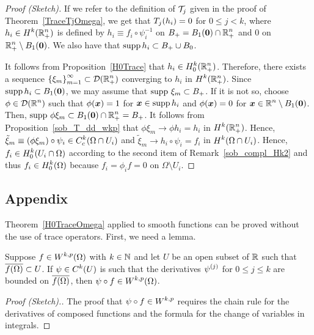 \begin{proof}[Proof (Sketch)]
If we refer to the definition of $\mathcal{T}_j$ given in the proof of
Theorem~\ref{TraceTjOmega}, we get that
$\displaystyle T_j(h_i) = 0$ for $0 \leq j <k$, where
$\displaystyle h_i \in H^k(\mathbb{R}^n_+)$ is defined by
$h_i \equiv f_i \circ \psi_i^{-1}$ on
$\displaystyle B_+ = B_1({\bm{0}}) \cap \mathbb{R}^n_+$
and $0$ on $\displaystyle \mathbb{R}^n_+ \setminus B_1({\bm{0}})$.  We also have that
$\operatorname{supp} h_i \subset B_+ \cup B_0$.

It follows from Proposition~\ref{H0Trace} that
$\displaystyle h_i \in H^k_0(\mathbb{R}^n_+)$.
Therefore, there exists a sequence
$\displaystyle \left\{\xi_m\right\}_{m=1}^\infty \subset \mathcal{D}(\mathbb{R}^n_+)$
converging to $h_i$ in $\displaystyle H^k(\mathbb{R}^n_+)$.  Since
$\operatorname{supp} h_i \subset B_1({\bm{0}})$, we may assume that
$\operatorname{supp}\, \xi_m \subset B_+$.  If it is not
so, choose $\displaystyle \phi \in \mathcal{D}(\mathbb{R}^n)$ such that
$\phi({\bm{x}}) = 1$ for ${\bm{x}} \in \operatorname{supp} h_i$ and $\phi({\bm{x}}) = 0$ for
$\displaystyle {\bm{x}} \in \mathbb{R}^n \setminus B_1({\bm{0}})$.
Then,
$\displaystyle \operatorname{supp}\, \phi \xi_m \subset B_1({\bm{0}}) \cap \mathbb{R}^n_+ = B_+$.
It follows from Proposition~\ref{sob_T_dd_wkp} that
$\phi \xi_m \to \phi h_i = h_i$ in $\displaystyle H^k(\mathbb{R}^n_+)$.
Hence, $\displaystyle \tilde{\xi}_m \equiv (\phi \xi_m) \circ
\psi_i \in C_c^k(\Omega \cap U_i)$
and $\tilde{\xi}_m \to h_i \circ \psi_i = f_i$
in $\displaystyle H^k(\Omega \cap U_i)$.
Hence, $\displaystyle f_i \in H^k_0(U_i \cap \Omega)$
according to the second item of Remark~\ref{sob_compl_Hk2}
and thus $\displaystyle f_i \in H^k_0(\Omega)$ because $f_i = \phi_i f = 0$ on
$\Omega \setminus U_i$.
\end{proof}

\subsection{Appendix}

Theorem~\ref{H0TraceOmega} applied to smooth functions can be proved
without the use of trace operators.  First, we need a lemma.

\begin{lemma} \label{sob_comp_DF}
Suppose $\displaystyle f \in W^{k,p}(\Omega)$ with $k\in \mathbb{N}$ and let
$U$ be an open subset of $\mathbb{R}$ such that
$\displaystyle \overline{ f(\Omega)} \subset U$.  If
$\displaystyle \psi \in C^k(U)$ is such that the derivatives
$\displaystyle \psi^{(j)}$ for $0\leq j \leq k$ are bounded on
$\displaystyle \overline{ f(\Omega)}$,
then $\displaystyle \psi \circ f \in W^{k,p}(\Omega)$.
\end{lemma}

\begin{proof}[Proof (Sketch).]
The proof that $\displaystyle \psi \circ f \in W^{k,p}$ requires the
chain rule for the derivatives of composed functions and the formula
for the change of variables in integrals.
\end{proof}

